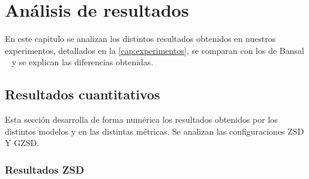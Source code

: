\chapter{Análisis de resultados} \label{cap:analisideresultado}

En este capitulo se analizan los distintos resultados obtenidos en nuestros experimentos, detallados en la \autoref{cap:experimentos}, se comparan con los de Bansal \etal~\cite{bansal2018zero} y se explican las diferencias obtenidas.

\section{Resultados cuantitativos} \label{sec:resultadoscuantitativos}

Esta sección desarrolla de forma numérica los resultados obtenidos por los distintos modelos y en las distintas métricas. Se analizan las configuraciones ZSD Y GZSD.

\subsection{Resultados ZSD}

